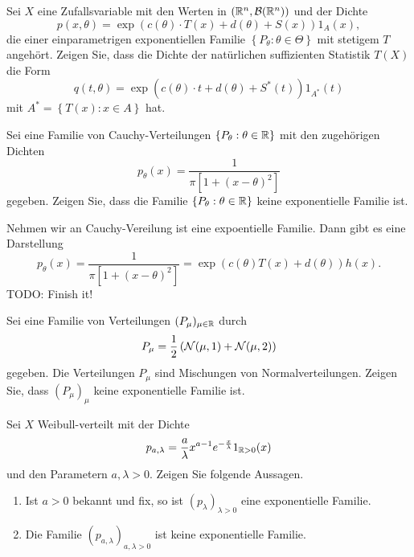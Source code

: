 Sei $X$ eine Zufallsvariable mit den Werten in $\left( \mathbb R^n, \mathcal B(\mathbb R^n)\right)$ und der Dichte
\begin{equation*}
	p(x,\theta) = \exp\left( c(\theta)\cdot T(x) + d(\theta) + S(x) \right) 1_{A}(x),
\end{equation*}
die einer einparametrigen exponentiellen Familie $\left\{ P_\theta :
\theta\in\Theta \right\}$ mit stetigem $T$ angehört. Zeigen Sie, dass die Dichte der natürlichen
suffizienten Statistik $T(X)$ die Form
\begin{equation*}
	q(t, \theta) = \exp\left( c(\theta)\cdot t + d(\theta) + S^*(t) \right) 1_{A^*}(t)
\end{equation*}
mit $A^* = \left\{ T(x) : x\in A \right\}$ hat.


  Sei eine
Familie von Cauchy-Verteilungen $\left\{ P_\theta : \theta\in\mathbb R \right\}$ mit 
den zugehörigen Dichten
\begin{equation*}
    p_\theta(x) = \frac{1}{\pi\left[ 1 + \left( x - \theta \right)^2 \right]}
\end{equation*}
gegeben. Zeigen Sie, dass die Familie $\left\{ P_\theta : \theta\in\mathbb R \right\}$ keine 
exponentielle Familie ist.

\solution Nehmen wir an Cauchy-Vereilung ist eine expoentielle Familie. Dann 
gibt es eine Darstellung 
\begin{equation}
    p_\theta(x) = \frac{1}{\pi\left[ 1 + \left( x - \theta \right)^2 \right]} =
    \exp\left( c(\theta) T(x) + d(\theta) \right)h(x).
\end{equation}
TODO: Finish it! 

Sei eine Familie von Verteilungen $(P_\mu)_{\mu\in\mathbb R}$ durch 
\begin{equation*}
    P_\mu = \frac{1}{2} \left( \mathcal N(\mu,1) +  \mathcal N(\mu,2) \right) 
\end{equation*}
gegeben. Die Verteilungen $P_\mu$ sind Mischungen von Normalverteilungen.
Zeigen Sie, dass $(P_\mu)_{\mu}$ keine exponentielle Familie ist.


Sei $X$ Weibull-verteilt mit der Dichte
\begin{equation*}
    p_{a,\lambda} = \frac{a}{\lambda} x^{a-1} e^{-\frac{x}{\lambda}} 1_{\mathbb R>0}(x)  
\end{equation*}
und den Parametern $a,\lambda>0$. Zeigen Sie folgende Aussagen.
\begin{enumerate}
    \item Ist $a>0$ bekannt und fix, so ist $(p_\lambda)_{\lambda>0}$ eine
        exponentielle Familie.
    \item Die Familie $(p_{a,\lambda})_{a,\lambda>0}$ ist keine exponentielle Familie. 
\end{enumerate} 


